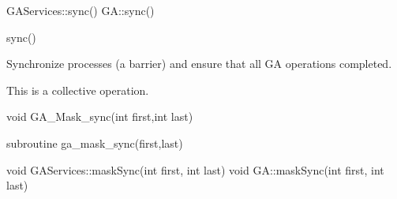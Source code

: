 \documentclass[12pt]{article}
\begin{document}
\begin{cxxapi}
\begin{cxxcode}
GAServices::sync()
GA::sync()
\end{cxxcode}
\end{cxxapi}

\begin{pyapi}
\begin{pycode}
sync()
\end{pycode}
\end{pyapi}

\begin{desc}

Synchronize processes (a barrier) and ensure that all GA operations completed.

This is a collective operation.

\end{desc}


\begin{capi}
\begin{ccode}
void GA_Mask_sync(int first,int last)
\end{ccode}
\begin{funcargs}
\end{funcargs}
\end{capi}

\begin{fapi}
\begin{fcode}
subroutine ga_mask_sync(first,last)
\end{fcode}
\begin{funcargs}
\end{funcargs}
\end{fapi}

\begin{cxxapi}
\begin{cxxcode}
void GAServices::maskSync(int first, int last)
void GA::maskSync(int first, int last)
\end{cxxcode}
\begin{funcargs}
\end{funcargs}
\end{cxxapi}
\end{document}
